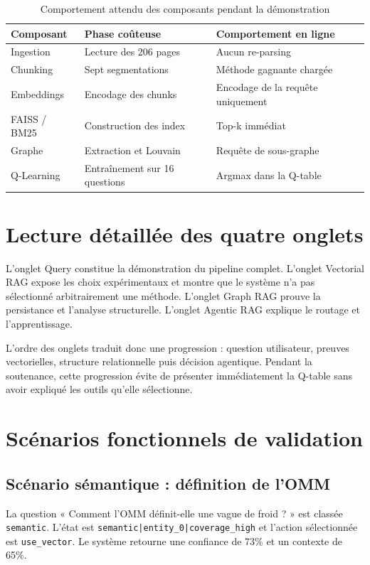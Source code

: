 \documentclass[12pt,a4paper,oneside]{report}
\newcommand{\tech}[1]{\texttt{#1}}
\begin{document}
\begin{table}[H]
\centering
\caption{Comportement attendu des composants pendant la démonstration}
\begin{tabularx}{\textwidth}{p{}p{}X}
\toprule
\textbf{Composant} & \textbf{Phase coûteuse} & \textbf{Comportement en ligne}\\
\midrule
Ingestion & Lecture des 206 pages & Aucun re-parsing\\
Chunking & Sept segmentations & Méthode gagnante chargée\\
Embeddings & Encodage des chunks & Encodage de la requête uniquement\\
FAISS / BM25 & Construction des index & Top-k immédiat\\
Graphe & Extraction et Louvain & Requête de sous-graphe\\
Q-Learning & Entraînement sur 16 questions & Argmax dans la Q-table\\
\bottomrule
\end{tabularx}
\end{table}

\section{Lecture détaillée des quatre onglets}
L'onglet Query constitue la démonstration du pipeline complet. L'onglet Vectorial RAG expose les choix expérimentaux et montre que le système n'a pas sélectionné arbitrairement une méthode. L'onglet Graph RAG prouve la persistance et l'analyse structurelle. L'onglet Agentic RAG explique le routage et l'apprentissage.

L'ordre des onglets traduit donc une progression : question utilisateur, preuves vectorielles, structure relationnelle puis décision agentique. Pendant la soutenance, cette progression évite de présenter immédiatement la Q-table sans avoir expliqué les outils qu'elle sélectionne.

\section{Scénarios fonctionnels de validation}
\subsection{Scénario sémantique : définition de l'OMM}
La question « Comment l'OMM définit-elle une vague de froid ? » est classée \tech{semantic}. L'état est \tech{semantic|entity\_0|coverage\_high} et l'action sélectionnée est \tech{use\_vector}. Le système retourne une confiance de 73\% et un contexte de 65\%.
\end{document}
